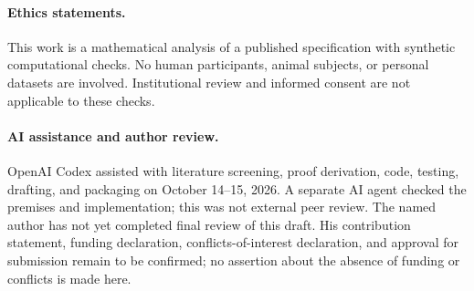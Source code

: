 \documentclass[11pt]{article}
\begin{document}
\paragraph{Ethics statements.}
This work is a mathematical analysis of a published specification with synthetic
computational checks. No human participants, animal subjects, or personal
datasets are involved. Institutional review and informed consent are not
applicable to these checks.

\paragraph{AI assistance and author review.}
OpenAI Codex assisted with literature screening, proof derivation, code,
testing, drafting, and packaging on October 14--15, 2026. A separate AI agent
checked the premises and implementation; this was not external peer review.
The named author has not yet completed final review of this draft. His
contribution statement, funding declaration, conflicts-of-interest declaration,
and approval for submission remain to be confirmed; no assertion about the
absence of funding or conflicts is made here.



\end{document}
